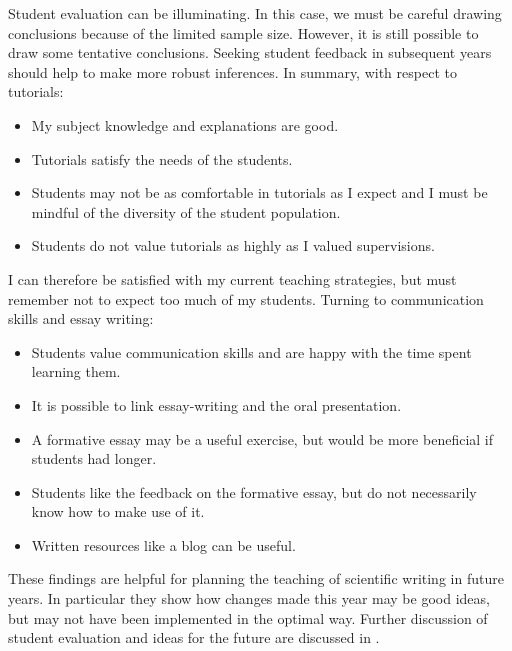 Student evaluation can be illuminating. In this case, we must be careful drawing conclusions because of the limited sample size. However, it is still possible to draw some tentative conclusions. Seeking student feedback in subsequent years should help to make more robust inferences. In summary, with respect to tutorials:
\begin{itemize}
\item My subject knowledge and explanations are good.
\item Tutorials satisfy the needs of the students.
\item Students may not be as comfortable in tutorials as I expect and I must be mindful of the diversity of the student population.
\item Students do not value tutorials as highly as I valued supervisions.
\end{itemize}
I can therefore be satisfied with my current teaching strategies, but must remember not to expect too much of my students. Turning to communication skills and essay writing:
\begin{itemize}
\item Students value communication skills and are happy with the time spent learning them.
\item It is possible to link essay-writing and the oral presentation.
\item A formative essay may be a useful exercise, but would be more beneficial if students had longer.
\item Students like the feedback on the formative essay, but do not necessarily know how to make use of it.
\item Written resources like a blog can be useful.
\end{itemize}
These findings are helpful for planning the teaching of scientific writing in future years. In particular they show how changes made this year may be good ideas, but may not have been implemented in the optimal way. Further discussion of student evaluation and ideas for the future are discussed in .
